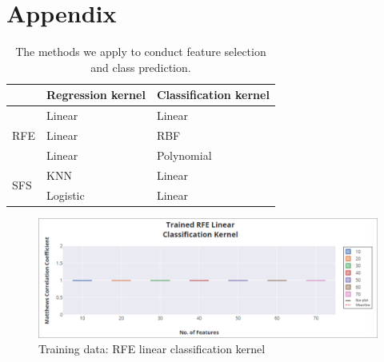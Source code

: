 \documentclass[a4paper,twocolumn]{article} %
\begin{document}
	
  \label{sec:ref}

	\newpage
\onecolumn
\section*{Appendix}
	
\begin{table}[h]
	\caption{The methods we apply to conduct feature selection and class prediction.}\label{tab:meth}
	\begin{tabular}{lll} %
		\hline
		& Regression kernel & Classification kernel\\
		\hline
		\multirow{3}{*}{RFE} & Linear & Linear\\
		& Linear            & RBF\\
		& Linear  & Polynomial   \\
		\hline
		\multirow{2}{*}{SFS} &KNN & Linear\\
		& Logistic                 & Linear\\
		\hline
	\end{tabular}
\end{table}

		\begin{figure}[h]
		\begin{center}
			\includegraphics[width=500pt]{Trained_RFE_Linear_Classification_Kernel.PNG}
			\caption{Training data: RFE linear classification kernel}
			\label{fig:Train_RFE_Linear}
		\end{center}
	\end{figure}
\end{document}
